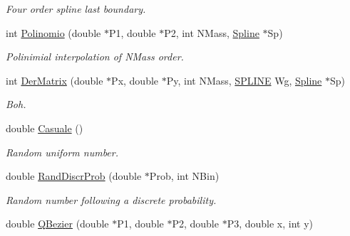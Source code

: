 \begin{DoxyCompactItemize}
\begin{DoxyCompactList}\small\item\em \-Four order spline last boundary. \end{DoxyCompactList}\item 
\hypertarget{classMatematica_a4811dba3bc03279d94c49e2a480dae4f}{int \hyperlink{classMatematica_a4811dba3bc03279d94c49e2a480dae4f}{\-Polinomio} (double $\ast$\-P1, double $\ast$\-P2, int \-N\-Mass, \hyperlink{classSpline}{\-Spline} $\ast$\-Sp)}\label{classMatematica_a4811dba3bc03279d94c49e2a480dae4f}

\begin{DoxyCompactList}\small\item\em \-Polinimial interpolation of  \-N\-Mass order. \end{DoxyCompactList}\item 
\hypertarget{classMatematica_a27b793e32b1410383bacb44d0233ee86}{int \hyperlink{classMatematica_a27b793e32b1410383bacb44d0233ee86}{\-Der\-Matrix} (double $\ast$\-Px, double $\ast$\-Py, int \-N\-Mass, \hyperlink{structSPLINE}{\-S\-P\-L\-I\-N\-E} \-Wg, \hyperlink{classSpline}{\-Spline} $\ast$\-Sp)}\label{classMatematica_a27b793e32b1410383bacb44d0233ee86}

\begin{DoxyCompactList}\small\item\em \-Boh. \end{DoxyCompactList}\item 
\hypertarget{classMatematica_a953e8be14f6a9c259f192683f3a5a970}{double \hyperlink{classMatematica_a953e8be14f6a9c259f192683f3a5a970}{\-Casuale} ()}\label{classMatematica_a953e8be14f6a9c259f192683f3a5a970}

\begin{DoxyCompactList}\small\item\em \-Random uniform number. \end{DoxyCompactList}\item 
\hypertarget{classMatematica_ad3a801671ce900a848167e341ee1a64f}{double \hyperlink{classMatematica_ad3a801671ce900a848167e341ee1a64f}{\-Rand\-Discr\-Prob} (double $\ast$\-Prob, int \-N\-Bin)}\label{classMatematica_ad3a801671ce900a848167e341ee1a64f}

\begin{DoxyCompactList}\small\item\em \-Random number following a discrete probability. \end{DoxyCompactList}\item 
\hypertarget{classMatematica_a2cd9afb9e7613f99ea679738094c5c82}{double \hyperlink{classMatematica_a2cd9afb9e7613f99ea679738094c5c82}{\-Q\-Bezier} (double $\ast$\-P1, double $\ast$\-P2, double $\ast$\-P3, double x, int y)}\label{classMatematica_a2cd9afb9e7613f99ea679738094c5c82}


\end{DoxyCompactItemize}
